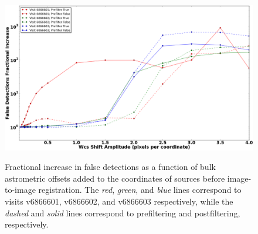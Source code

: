 \documentclass[prd, nofootinbib, floatfix, 11pt,tightenlines,times]{article}
\begin{document}
\begin{figure}
\includegraphics[width=1.0\textwidth]{figures/wcs_shift.eps} \\
\caption{Fractional increase in false detections as a function of bulk
  astrometric offsets added to the coordinates of sources before
  image-to-image registration.  The {\it red}, {\it green}, and {\it
    blue} lines correspond to visits v6866601, v6866602, and v6866603
  respectively, while the {\it dashed} and {\it solid} lines
  correspond to prefiltering and postfiltering, respectively.}
\label{wcsshift}
\end{figure}
\end{document}
